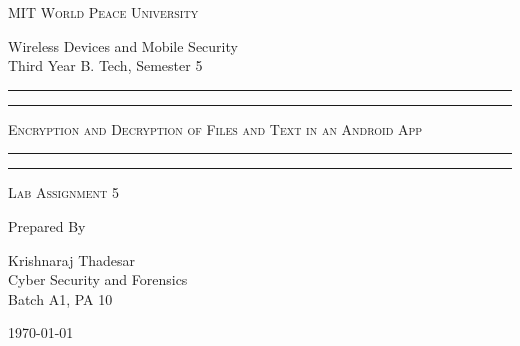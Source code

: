 \documentclass[11pt]{article}
\begin{document}
\begin{titlepage}
    \centering


    \huge\textsc{
        MIT World Peace University
    }\\

    \vspace{0.75\baselineskip} %

    \LARGE{
        Wireless Devices and Mobile Security\\
        Third Year B. Tech, Semester 5
    }

    \vfill %


    \rule{\textwidth}{1.6pt}\vspace*{-\baselineskip}\vspace*{2pt}
    \rule{\textwidth}{0.6pt}
    \vspace{0.75\baselineskip} %

    \huge{\textsc{
            Encryption and Decryption of Files and Text in an Android App
        }} \\

    \vspace{0.5\baselineskip} %
    \rule{\textwidth}{0.6pt}\vspace*{-\baselineskip}\vspace*{2.8pt}
    \rule{\textwidth}{1.6pt}

    \vspace{1\baselineskip} %


    \LARGE\textsc{
        Lab Assignment 5
    } %
    \vfill


    Prepared By \vspace{0.5\baselineskip} %

    \Large{
        Krishnaraj Thadesar \\
        Cyber Security and Forensics\\
        Batch A1, PA 10
    }

    \vspace{0.5\baselineskip} %
    \today

\end{titlepage}
\end{document}
